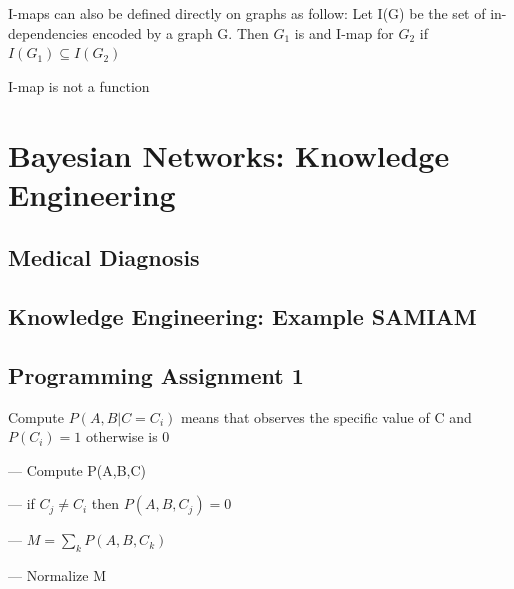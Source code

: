 \documentclass{book}
\begin{document}
I-maps can also be defined directly on graphs as follow: Let I(G) be the set of in-dependencies encoded by a graph G. Then $G_1$ is and I-map for $G_2$ if $I(G_1) \subseteq I(G_2)$

I-map is not a function

\section{Bayesian Networks: Knowledge Engineering}

\subsection{Medical Diagnosis}
\subsection{Knowledge Engineering: Example SAMIAM}

\subsection{Programming Assignment 1}

Compute $P(A,B|C=C_i)$ means that observes the specific value of C and $P(C_i) = 1$ otherwise is 0

--- Compute P(A,B,C)

--- if $C_j \neq C_i$ then  $P(A,B,C_j) = 0$

--- $M = \sum_{k} P(A,B,C_k)$

--- Normalize M




 
\end{document}
